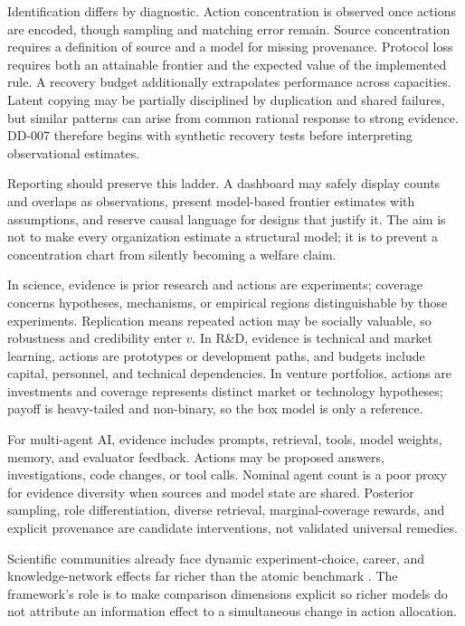 \documentclass[11pt]{article}
\theoremstyle{remark}
\begin{document}
Identification differs by diagnostic. Action concentration is observed once actions are encoded, though sampling and matching error remain. Source concentration requires a definition of source and a model for missing provenance. Protocol loss requires both an attainable frontier and the expected value of the implemented rule. A recovery budget additionally extrapolates performance across capacities. Latent copying may be partially disciplined by duplication and shared failures, but similar patterns can arise from common rational response to strong evidence. DD-007 therefore begins with synthetic recovery tests before interpreting observational estimates.

Reporting should preserve this ladder. A dashboard may safely display counts and overlaps as observations, present model-based frontier estimates with assumptions, and reserve causal language for designs that justify it. The aim is not to make every organization estimate a structural model; it is to prevent a concentration chart from silently becoming a welfare claim.

In science, evidence is prior research and actions are experiments; coverage concerns hypotheses, mechanisms, or empirical regions distinguishable by those experiments. Replication means repeated action may be socially valuable, so robustness and credibility enter $v$. In R\&D, evidence is technical and market learning, actions are prototypes or development paths, and budgets include capital, personnel, and technical dependencies. In venture portfolios, actions are investments and coverage represents distinct market or technology hypotheses; payoff is heavy-tailed and non-binary, so the box model is only a reference.

For multi-agent AI, evidence includes prompts, retrieval, tools, model weights, memory, and evaluator feedback. Actions may be proposed answers, investigations, code changes, or tool calls. Nominal agent count is a poor proxy for evidence diversity when sources and model state are shared. Posterior sampling, role differentiation, diverse retrieval, marginal-coverage rewards, and explicit provenance are candidate interventions, not validated universal remedies.

Scientific communities already face dynamic experiment-choice, career, and knowledge-network effects far richer than the atomic benchmark \citep{RzhetskyEtAl2015,March1991,Kitcher1990,Zollman2007}. The framework's role is to make comparison dimensions explicit so richer models do not attribute an information effect to a simultaneous change in action allocation.
\end{document}
